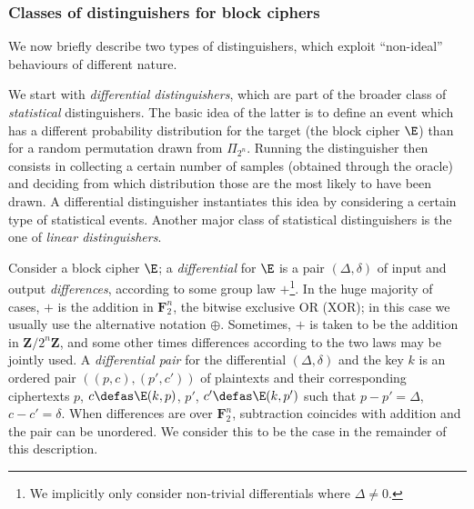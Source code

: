 \subsubsection{Classes of distinguishers for block ciphers}

We now briefly describe two types of distinguishers, which exploit ``non-ideal'' behaviours of different nature.

\bigskip

We start with \emph{differential distinguishers}, which are part of the broader class of \emph{statistical} distinguishers.
The basic idea of the latter is to define an event which has a different probability distribution for the target (the block cipher $\E$)
than for a random permutation drawn from $\Pi_{2^n}$. Running the distinguisher then consists in collecting a certain number of samples (obtained through
the oracle) and deciding from which distribution
those are the
most likely to have been drawn.
A differential distinguisher instantiates this idea by considering a certain type of statistical events. Another major class of
statistical distinguishers is the one of \emph{linear distinguishers}.

Consider a block cipher $\E$; a \emph{differential} for $\E$ is a pair $(\Delta,\delta)$ of input and output \emph{differences},
according to some group law $+$\footnote{We implicitly only consider non-trivial differentials where $\Delta \neq 0$.}.
In the huge majority of cases, $+$ is the addition in $\mathbf{F}_2^n$,
\ie the bitwise exclusive OR (XOR); in this case we usually use the alternative notation $\oplus$. Sometimes, $+$
is taken to be the addition in $\mathbf{Z}/2^n\mathbf{Z}$, and some other times differences according to the two laws may be jointly used.
A \emph{differential pair} for the differential $(\Delta,\delta)$ and the key $k$ is an ordered pair $((p,c), (p',c'))$
of plaintexts and their corresponding ciphertexts
$p$, $c \defas \E(k,p)$, $p'$, $c' \defas \E(k,p')$ such that $p - p' = \Delta$, $c - c' = \delta$. When differences are over $\mathbf{F}_2^n$,
subtraction coincides with addition and the pair can be unordered. We consider this to be the case in the remainder of this description.

